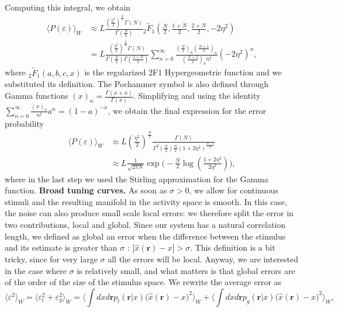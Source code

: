 \documentclass[a4paper]{article}%
\begin{document}
Computing this integral, we obtain
\begin{equation}%
\begin{split}
\langle P(\varepsilon)\rangle_{W}  & \approx L \frac{(\frac{\eta^{2}}%
{2})^{\frac{N}{2}}\Gamma(N)}{\Gamma(\frac{N}{2})} {}_{2}\tilde{F}_{1}(\frac
{N}{2},\frac{1+N}{2},\frac{2+N}{2},-2\eta^{2})\\
& =L \frac{(\frac{\eta^{2}}{2})^{\frac{N}{2}}\Gamma(N)}{\Gamma(\frac{N}%
{2})\Gamma(\frac{2+N}{2})}\sum_{n=0}^{\infty}\frac{(\frac{N}{2})_{n}
(\frac{N+1}{2})_{n}}{(\frac{N+2}{2})_{n} n!} (-2\eta^{2})^{n},
\end{split}
\end{equation}
where ${}_{2}\tilde{F}_{1}(a,b,c,x)$ is the regularized 2F1 Hypergeometric
function and we substituted its definition. The Pochammer symbol is also
defined through Gamma functions $(x)_{n} = \frac{\Gamma(x+n)}{\Gamma(x)}$.
Simplifying and using the identity $\sum_{n=0}^{\infty}\frac{(x)_{n}}{n!}
a^{n} = (1-a)^{-x}$, we obtain the final expression for the error probability
\begin{equation}%
\begin{split}
\langle P(\varepsilon)\rangle_{W}  & \approx L (\frac{\eta^{2}}{2})^{\frac
{N}{2}} \frac{\Gamma(N)}{\Gamma^{2}(\frac{N}{2}) \frac{N}{2} (1+2\eta
^{2})^{\frac{N+1}{2}}}\\
& \approx L \frac{1}{\sqrt{2\pi N}} \exp{\Big(-\frac{N}{2} \log(\frac
{1+2\eta^{2}}{2\eta^{2}})\Big)},
\end{split}
\label{Eq:GE}%
\end{equation}
where in the last step we used the Stirling approximation for the Gamma
function. \newline\newline\textbf{Broad tuning curves.} As soon as $\sigma>
0$, we allow for continuous stimuli and the resulting manifold in the activity
space is smooth. In this case, the noise can also produce small scale local
errors: we therefore split the error in two contributions, local and global.
Since our system has a natural correlation length, we defined as global an
error when the difference between the stimulus and its estimate is greater
than $\sigma$ : $|\hat{x}(\mathbf{r}) - x |> \sigma$. This definition is a bit
tricky, since for very large $\sigma$ all the errors will be local. Anyway, we
are interested in the case where $\sigma$ is relatively small, and what
matters is that global errors are of the order of the size of the stimulus
space. We rewrite the average error as
\begin{equation}
\langle\varepsilon^{2} \rangle_{W}= \langle\varepsilon_{l}^{2} +
\varepsilon_{g}^{2} \rangle_{W}= \langle\int dx d\mathbf{r} p_{l}%
(\mathbf{r}|x)\big(\hat{x}(\mathbf{r}) -x \big)^{2}\rangle_{W} + \langle\int
dx d\mathbf{r}p_{g}(\mathbf{r}|x) \big(\hat{x}(\mathbf{r}) -x \big)^{2}%
\rangle_{W},
\end{equation}
\end{document}
